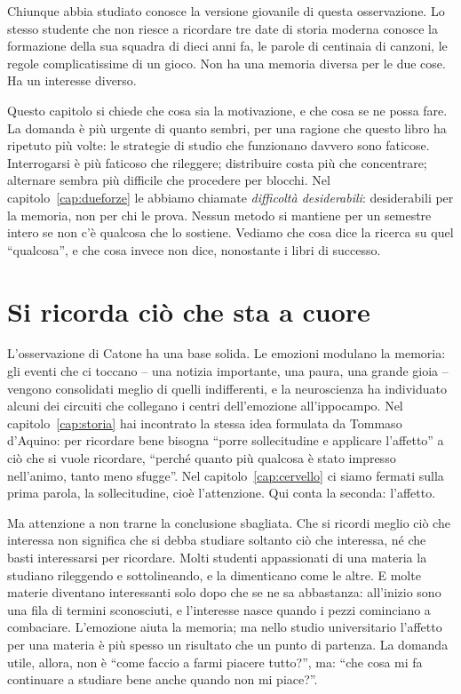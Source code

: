 Chiunque abbia studiato conosce la versione giovanile di questa
osservazione. Lo stesso studente che non riesce a ricordare tre date
di storia moderna conosce la formazione della sua squadra di dieci anni
fa, le parole di centinaia di canzoni, le regole complicatissime di un
gioco. Non ha una memoria diversa per le due cose. Ha un interesse
diverso.

Questo capitolo si chiede che cosa sia la motivazione, e che cosa se ne
possa fare. La domanda è più urgente di quanto sembri, per una ragione
che questo libro ha ripetuto più volte: le strategie di studio che
funzionano davvero sono faticose. Interrogarsi è più faticoso che
rileggere; distribuire costa più che concentrare; alternare sembra
più difficile che procedere per blocchi. Nel capitolo~\ref{cap:dueforze}
le abbiamo chiamate \emph{difficoltà desiderabili}: desiderabili per la
memoria, non per chi le prova. Nessun metodo si mantiene per un
semestre intero se non c'è qualcosa che lo sostiene. Vediamo che cosa
dice la ricerca su quel \enquote{qualcosa}, e che cosa invece non dice,
nonostante i libri di successo.

\section{Si ricorda ciò che sta a cuore}

L'osservazione di Catone ha una base solida. Le emozioni modulano la
memoria: gli eventi che ci toccano -- una notizia importante, una paura,
una grande gioia -- vengono consolidati meglio di quelli indifferenti,
e la neuroscienza ha individuato alcuni dei circuiti che collegano i
centri dell'emozione all'ippocampo. Nel capitolo~\ref{cap:storia} hai
incontrato la stessa idea formulata da Tommaso d'Aquino: per ricordare
bene bisogna \enquote{porre sollecitudine e applicare l'affetto} a ciò
che si vuole ricordare, \enquote{perché quanto più qualcosa è stato
impresso nell'animo, tanto meno sfugge}. Nel
capitolo~\ref{cap:cervello} ci siamo fermati sulla prima parola, la
sollecitudine, cioè l'attenzione. Qui conta la seconda: l'affetto.

Ma attenzione a non trarne la conclusione sbagliata. Che si ricordi
meglio ciò che interessa non significa che si debba studiare soltanto
ciò che interessa, né che basti interessarsi per ricordare. Molti
studenti appassionati di una materia la studiano rileggendo e
sottolineando, e la dimenticano come le altre. E molte materie
diventano interessanti solo dopo che se ne sa abbastanza: all'inizio
sono una fila di termini sconosciuti, e l'interesse nasce quando i
pezzi cominciano a combaciare. L'emozione aiuta la memoria; ma nello
studio universitario l'affetto per una materia è più spesso un
risultato che un punto di partenza. La domanda utile, allora, non è
\enquote{come faccio a farmi piacere tutto?}, ma: \enquote{che cosa mi
fa continuare a studiare bene anche quando non mi piace?}.

